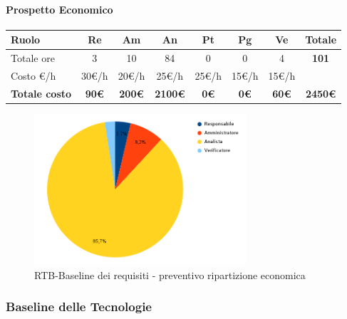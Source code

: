 \paragraph{Prospetto Economico}
\begin{center}
	\renewcommand{\arraystretch}{1.8} %
	\begin{tabular}{ |m{10em}|c|c|c|c|c|c|c| }
	\hline
	\textbf{Ruolo} & \textbf{Re} & \textbf{Am} &  \textbf{An} &  \textbf{Pt} &  \textbf{Pg} &  \textbf{Ve} &  \textbf{Totale}\\
    \hline
    Totale ore & 3 & 10 & 84 & 0 & 0 & 4 & \textbf{101}\\
    \hline
    Costo \euro/h & 30\euro/h & 20\euro/h & 25\euro/h & 25\euro/h & 15\euro/h & 15\euro/h & \\
    \hline
    \textbf{Totale costo} & \textbf{90\euro} & \textbf{200\euro} &  \textbf{2100\euro} &  \textbf{0\euro} &  \textbf{0\euro} &  \textbf{60\euro} &  \textbf{2450\euro}\\
    \hline
	\end{tabular}

    \begin{figure}[H]
        \centering\includegraphics[width=0.7\textwidth, height=0.7\textheight, keepaspectratio]{images/preventivo/RTB-requisiti-costo.png}
        \caption{RTB-Baseline dei requisiti - preventivo ripartizione economica}
    \end{figure}
    
\end{center}

\subsubsection{Baseline delle Tecnologie}
